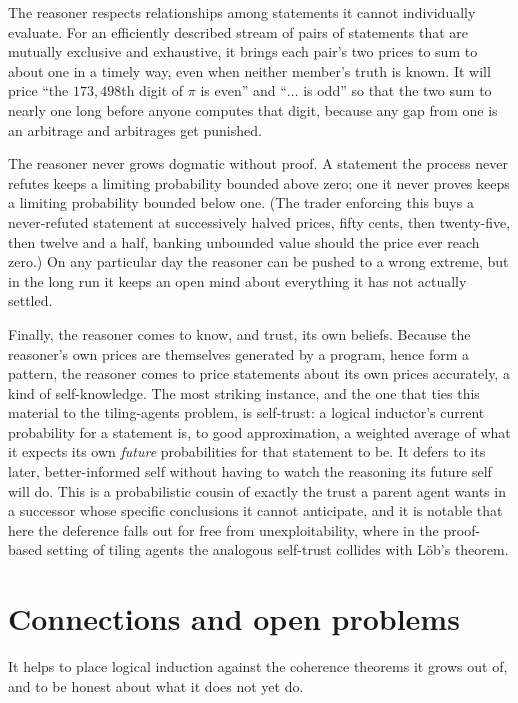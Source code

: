 \documentclass[10pt]{article}
\theoremstyle{definition}
\theoremstyle{remark}
\begin{document}
The reasoner respects relationships among statements it cannot individually evaluate. For an efficiently described stream of pairs of statements that are mutually exclusive and exhaustive, it brings each pair's two prices to sum to about one in a timely way, even when neither member's truth is known. It will price ``the $173{,}498$th digit of $\pi$ is even'' and ``$\dots$ is odd'' so that the two sum to nearly one long before anyone computes that digit, because any gap from one is an arbitrage and arbitrages get punished.

The reasoner never grows dogmatic without proof. A statement the process never refutes keeps a limiting probability bounded above zero; one it never proves keeps a limiting probability bounded below one. (The trader enforcing this buys a never-refuted statement at successively halved prices, fifty cents, then twenty-five, then twelve and a half, banking unbounded value should the price ever reach zero.) On any particular day the reasoner can be pushed to a wrong extreme, but in the long run it keeps an open mind about everything it has not actually settled.

Finally, the reasoner comes to know, and trust, its own beliefs. Because the reasoner's own prices are themselves generated by a program, hence form a pattern, the reasoner comes to price statements about its own prices accurately, a kind of self-knowledge. The most striking instance, and the one that ties this material to the tiling-agents problem, is self-trust: a logical inductor's current probability for a statement is, to good approximation, a weighted average of what it expects its own \emph{future} probabilities for that statement to be. It defers to its later, better-informed self without having to watch the reasoning its future self will do. This is a probabilistic cousin of exactly the trust a parent agent wants in a successor whose specific conclusions it cannot anticipate, and it is notable that here the deference falls out for free from unexploitability, where in the proof-based setting of tiling agents the analogous self-trust collides with L\"ob's theorem.

\section{Connections and open problems}
\label{sec:connections}

It helps to place logical induction against the coherence theorems it grows out of, and to be honest about what it does not yet do.
\end{document}
